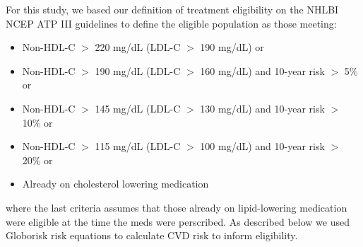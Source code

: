 \documentclass[12pt]{article}
\begin{document}
\begin{appendix}
\begin{refsection}
    For this study, we based our definition of treatment eligibility on the NHLBI NCEP ATP III guidelines to define the eligible population as those meeting:
    \begin{itemize}
        \item Non-HDL-C $>$ 220 mg/dL (LDL-C $>$ 190 mg/dL) or
        \item Non-HDL-C $>$ 190 mg/dL (LDL-C $>$ 160 mg/dL) and 10-year risk $>$ 5\% or
        \item Non-HDL-C $>$ 145 mg/dL (LDL-C $>$ 130 mg/dL) and 10-year risk $>$ 10\% or
        \item Non-HDL-C $>$ 115 mg/dL (LDL-C $>$ 100 mg/dL) and 10-year risk $>$ 20\% or
        \item Already on cholesterol lowering medication
    \end{itemize}
    where the last criteria assumes that those already on lipid-lowering medication were eligible at the time the meds were perscribed. As described below we used Globorisk risk equations to calculate CVD risk to inform eligibility.

    
\begin{landscape}


\end{landscape}
\end{refsection}
\end{appendix}
\end{document}
